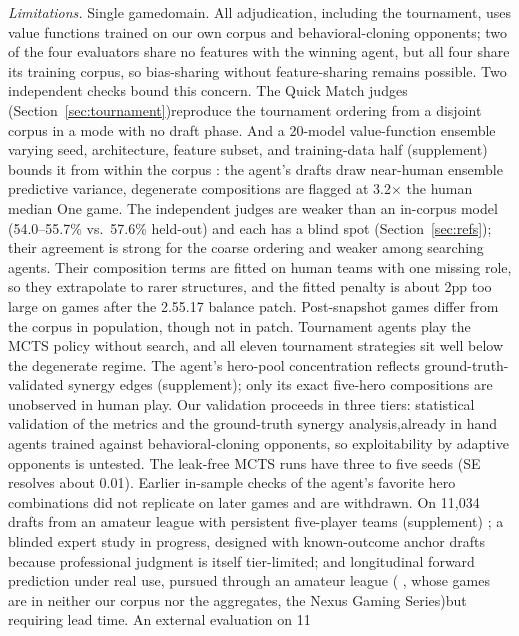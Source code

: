 \documentclass[journal]{IEEEtran}
\providecommand{\DIFaddtex}[1]{{\protect\color{blue} \sf #1}} %
\providecommand{\DIFdeltex}[1]{{\protect\color{red} \scriptsize #1}} %
\providecommand{\DIFaddbegin}{} %
\providecommand{\DIFaddend}{} %
\providecommand{\DIFdelbegin}{} %
\providecommand{\DIFdelend}{} %
\providecommand{\DIFadd}[1]{\texorpdfstring{\DIFaddtex{#1}}{#1}} %
\providecommand{\DIFdel}[1]{\texorpdfstring{\DIFdeltex{#1}}{}} %
\begin{document}
\textit{Limitations.} \DIFdelbegin \DIFdel{Single gamedomain. All adjudication, including the tournament, uses value functions trained on our own corpus and behavioral-cloning opponents; two of the four evaluators share no features with the winning agent, but all four share its training corpus, so bias-sharing without feature-sharing remains possible.
Two independent checks bound this concern. The Quick Match judges (Section~\ref{sec:tournament})reproduce the tournament ordering from a disjoint corpus in a mode with no draft phase. And a 20-model value-function ensemble varying seed, architecture, feature subset, and training-data half (supplement) bounds it from within the corpus : the agent's drafts draw near-human ensemble predictive variance, degenerate compositions are flagged at 3.2$\times$ the human median}\DIFdelend \DIFaddbegin \DIFadd{One game. The independent judges are weaker than an in-corpus model (54.0--55.7\% vs.\ 57.6\% held-out) and each has a blind spot (Section~\ref{sec:refs}); their agreement is strong for the coarse ordering and weaker among searching agents. Their composition terms are fitted on human teams with one missing role, so they extrapolate to rarer structures, and the fitted penalty is about 2pp too large on games after the 2.55.17 balance patch. Post-snapshot games differ from the corpus in population, though not in patch. Tournament agents play the MCTS policy without search}\DIFaddend , and all \DIFdelbegin \DIFdel{eleven tournament strategies sit well below the degenerate regime. The agent's hero-pool concentration reflects ground-truth-validated synergy edges (supplement); only its exact five-hero compositions are unobserved in human play. Our validation proceeds in three tiers: statistical validation of the metrics and the ground-truth synergy analysis,already in hand }\DIFdelend \DIFaddbegin \DIFadd{agents trained against behavioral-cloning opponents, so exploitability by adaptive opponents is untested. The leak-free MCTS runs have three to five seeds (SE resolves about 0.01). Earlier in-sample checks of the agent's favorite hero combinations did not replicate on later games and are withdrawn. On 11,034 drafts from an amateur league with persistent five-player teams }\DIFaddend (supplement)\DIFdelbegin \DIFdel{; a blinded expert study in progress, designed with known-outcome anchor drafts because professional judgment is itself tier-limited; and longitudinal forward prediction under real use, pursued through an amateur league (}\DIFdelend \DIFaddbegin \DIFadd{, whose games are in neither our corpus nor the aggregates, }\DIFaddend the \DIFdelbegin \DIFdel{Nexus Gaming Series)but requiring lead time. An external evaluation on 11}%
\end{document}
